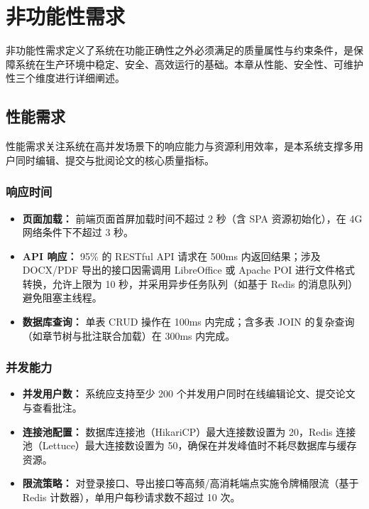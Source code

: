 
\section{非功能性需求}

非功能性需求定义了系统在功能正确性之外必须满足的质量属性与约束条件，是保障系统在生产环境中稳定、安全、高效运行的基础。本章从性能、安全性、可维护性三个维度进行详细阐述。

\subsection{性能需求}

性能需求关注系统在高并发场景下的响应能力与资源利用效率，是本系统支撑多用户同时编辑、提交与批阅论文的核心质量指标。

\subsubsection{响应时间}

\begin{itemize}
    \item \textbf{页面加载：} 前端页面首屏加载时间不超过 2 秒（含 SPA 资源初始化），在 4G 网络条件下不超过 3 秒。
    \item \textbf{API 响应：} 95\% 的 RESTful API 请求在 500ms 内返回结果；涉及 DOCX/PDF 导出的接口因需调用 LibreOffice 或 Apache POI 进行文件格式转换，允许上限为 10 秒，并采用异步任务队列（如基于 Redis 的消息队列）避免阻塞主线程。
    \item \textbf{数据库查询：} 单表 CRUD 操作在 100ms 内完成；含多表 JOIN 的复杂查询（如章节树与批注联合加载）在 300ms 内完成。
\end{itemize}

\subsubsection{并发能力}

\begin{itemize}
    \item \textbf{并发用户数：} 系统应支持至少 200 个并发用户同时在线编辑论文、提交论文与查看批注。
    \item \textbf{连接池配置：} 数据库连接池（HikariCP）最大连接数设置为 20，Redis 连接池（Lettuce）最大连接数设置为 50，确保在并发峰值时不耗尽数据库与缓存资源。
    \item \textbf{限流策略：} 对登录接口、导出接口等高频/高消耗端点实施令牌桶限流（基于 Redis 计数器），单用户每秒请求数不超过 10 次。
\end{itemize}

